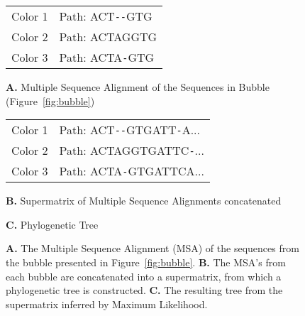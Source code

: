 \documentclass[hidelinks, 10pt, conference, compsocconf]{IEEEtran}
\begin{document}
\begin{figure}
\centering

\begin{tabular}{cl}
{\color{yellow}Color 1} & Path: ACT\texttt{-}\texttt{-}GTG \\
{\color{red}Color 2} & Path: ACTAGGTG \\ 
{\color{blue}Color 3} & Path: ACTA\texttt{-}GTG \\
\end{tabular}

\begin{flushleft}
\textbf{A.} Multiple Sequence Alignment of the Sequences in Bubble (Figure~\ref{fig:bubble}) \\
\end{flushleft}

\medskip

\begin{tabular}{cl}
{\color{yellow}Color 1} & Path: ACT\texttt{-}\texttt{-}GTGATT\texttt{-}A... \\
{\color{red}Color 2} & Path: ACTAGGTGATTC\texttt{-}... \\ 
{\color{blue}Color 3} & Path: ACTA\texttt{-}GTGATTCA... \\
\end{tabular}

\begin{flushleft}
\textbf{B.} Supermatrix of Multiple Sequence Alignments concatenated \\
\end{flushleft}

\medskip


\begin{flushleft}
\textbf{C.} Phylogenetic Tree \\
\end{flushleft}

\caption{\textbf{A.} The Multiple Sequence Alignment (MSA) of the sequences from the bubble presented in Figure~\ref{fig:bubble}.
\textbf{B.} The MSA's from each bubble are concatenated into a supermatrix, from which a phylogenetic tree is constructed.
\textbf{C.} The resulting tree from the supermatrix inferred by Maximum Likelihood.
\label{fig:overall}}
\end{figure}
\end{document}
